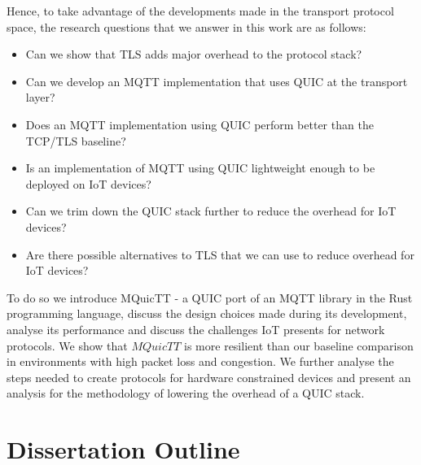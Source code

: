 Hence, to take advantage of the developments made in the transport protocol space, the research questions that we answer in this work are as follows:

\begin{itemize}
    \item Can we show that TLS adds major overhead to the protocol stack?
    \item Can we develop an MQTT implementation that uses QUIC at the transport layer?
    \item Does an MQTT implementation using QUIC perform better than the TCP/TLS baseline?
    \item Is an implementation of MQTT using QUIC lightweight enough to be deployed on IoT devices?
    \item Can we trim down the QUIC stack further to reduce the overhead for IoT devices?
    \item Are there possible alternatives to TLS that we can use to reduce overhead for IoT devices?
\end{itemize}

To do so we introduce MQuicTT - a QUIC port of an MQTT library in the Rust programming language, discuss the design choices made during its development, analyse its performance and discuss the challenges IoT presents for network protocols.
We show that $MQuicTT$ is more resilient than our baseline comparison in environments with high packet loss and congestion.
We further analyse the steps needed to create protocols for hardware constrained devices and present an analysis for the methodology of lowering the overhead of a QUIC stack.

\section{Dissertation Outline}

